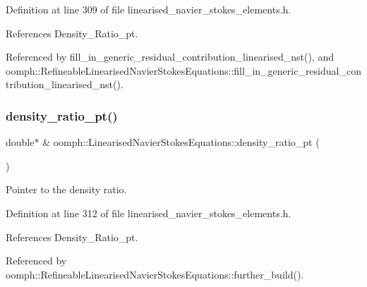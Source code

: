 Definition at line 309 of file linearised\+\_\+navier\+\_\+stokes\+\_\+elements.\+h.



References Density\+\_\+\+Ratio\+\_\+pt.



Referenced by fill\+\_\+in\+\_\+generic\+\_\+residual\+\_\+contribution\+\_\+linearised\+\_\+nst(), and oomph\+::\+Refineable\+Linearised\+Navier\+Stokes\+Equations\+::fill\+\_\+in\+\_\+generic\+\_\+residual\+\_\+contribution\+\_\+linearised\+\_\+nst().

\mbox{\label{classoomph_1_1LinearisedNavierStokesEquations_a4b08ed0863cbe6a7d4420e555decc0a2}} 
\subsubsection{\texorpdfstring{density\+\_\+ratio\+\_\+pt()}{density\_ratio\_pt()}}
{\footnotesize\ttfamily double$\ast$ \& oomph\+::\+Linearised\+Navier\+Stokes\+Equations\+::density\+\_\+ratio\+\_\+pt (\begin{DoxyParamCaption}{ }\end{DoxyParamCaption})\hspace{0.3cm}{\ttfamily [inline]}}



Pointer to the density ratio. 



Definition at line 312 of file linearised\+\_\+navier\+\_\+stokes\+\_\+elements.\+h.



References Density\+\_\+\+Ratio\+\_\+pt.



Referenced by oomph\+::\+Refineable\+Linearised\+Navier\+Stokes\+Equations\+::further\+\_\+build().

\mbox{\label{classoomph_1_1LinearisedNavierStokesEquations_a91f0b26ac8168653980bd3ab3d49cc65}} 
